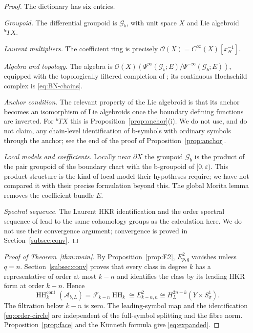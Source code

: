 \documentclass[11pt,oneside,reqno]{article}
\DeclareMathOperator{\HH}{HH}
\newcommand{\cA}{\mathcal A}
\newcommand{\cO}{\mathcal O}
\newcommand{\Gb}{\mathcal G_b}
\theoremstyle{plain}
\theoremstyle{definition}
\theoremstyle{remark}
\begin{document}
\begin{proof}
The dictionary has six entries.

\emph{Groupoid.} The differential groupoid is \(\Gb\), with unit space
\(X\) and Lie algebroid \({}^bTX\).

\emph{Laurent multipliers.} The coefficient ring is precisely
\(\cO(X)=C^\infty(X)[x_H^{-1}]\).

\emph{Algebra and topology.} The algebra is
\(\cO(X)(\Psi^\infty(\Gb;E)/\Psi^{-\infty}(\Gb;E))\), equipped with the
topologically filtered completion of \cite{BNfamilies}; its continuous
Hochschild complex is \eqref{eq:BN-chains}.

\emph{Anchor condition.} The relevant property of the Lie algebroid is
that its anchor becomes an isomorphism of Lie algebroids once the boundary
defining functions are inverted. For \({}^bTX\) this is
Proposition~\ref{prop:anchor}(i). We do not use, and do not claim, any
chain-level identification of b-symbols with ordinary symbols through the
anchor; see the end of the proof of Proposition~\ref{prop:anchor}.

\emph{Local models and coefficients.} Locally near \(\partial X\) the
groupoid \(\Gb\) is the product of the pair groupoid of the boundary chart
with the b-groupoid of \([0,\varepsilon)\). This product structure is the
kind of local model their hypotheses require; we have not compared it with
their precise formulation beyond this. The global Morita lemma removes the
coefficient bundle \(E\).

\emph{Spectral sequence.} The Laurent HKR identification and the order
spectral sequence of \cite{BNsymbols,BNfamilies} lead to the same
cohomology groups as the calculation here. We do not use their
convergence argument; convergence is proved in Section~\ref{subsec:conv}.
\end{proof}

\begin{proof}[Proof of Theorem~\ref{thm:main}]
By Proposition~\ref{prop:E2}, \(E^2_{p,q}\) vanishes unless \(q=n\).
Section~\ref{subsec:conv} proves that every class in degree \(k\)
has a representative of order at most \(k-n\) and identifies the
class by its leading HKR form at order \(k-n\). Hence
\[
 \HH_k^{\mathrm{cont}}(\cA_{b,L})
 =\mathcal F_{k-n}\HH_k
 \cong E^2_{k-n,n}\cong H_L^{2n-k}(Y\times S^1_\sigma).
\]
The filtration below \(k-n\) is zero. The leading-symbol map and
the identification \eqref{eq:order-circle} are independent of the
full-symbol splitting and the fibre norm. Proposition~\ref{prop:face}
and the K\"unneth formula give \eqref{eq:expanded}.
\end{proof}
\end{document}
